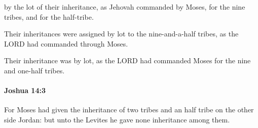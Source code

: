 			\begin{versebox}
					\item[BHS] 
					\item[ASV] by the lot of their inheritance, as Jehovah commanded by Moses, for the nine tribes, and for the half-tribe.
					\item[NIV] Their inheritances were assigned by lot to the nine-and-a-half tribes, as the LORD had commanded through Moses.
					\item[NRSV] Their inheritance was by lot, as the LORD had commanded Moses for the nine and one-half tribes.
			\end{versebox}

		\paragraph{Joshua 14:3} %
			\label{JOSHUA-14-3}

			For Moses had given the inheritance of two tribes and an half tribe on the other side Jordan: but unto the Levites he gave none inheritance among them.

